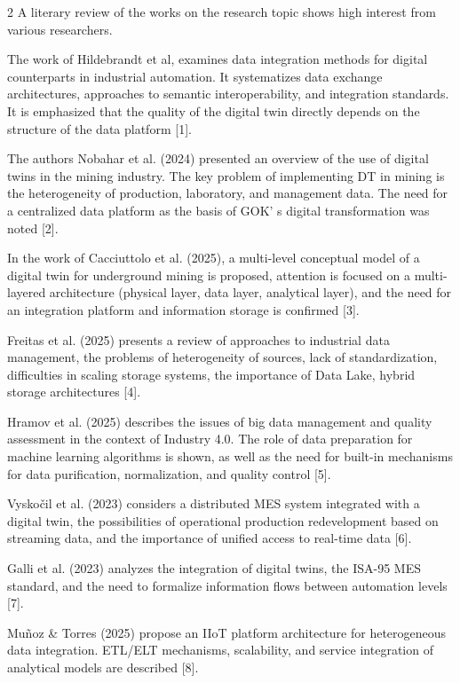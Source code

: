 \begin{multicols}{2}
A literary review of the works on the research topic shows high interest
from various researchers.

The work of Hildebrandt et al, examines data integration methods for
digital counterparts in industrial automation. It systematizes data
exchange architectures, approaches to semantic interoperability, and
integration standards. It is emphasized that the quality of the digital
twin directly depends on the structure of the data platform {[}1{]}.

The authors Nobahar et al. (2024) presented an overview of the use of
digital twins in the mining industry. The key problem of implementing DT
in mining is the heterogeneity of production, laboratory, and management
data. The need for a centralized data platform as the basis of
GOK' s digital transformation was noted {[}2{]}.

In the work of Cacciuttolo et al. (2025), a multi-level conceptual model
of a digital twin for underground mining is proposed, attention is
focused on a multi-layered architecture (physical layer, data layer,
analytical layer), and the need for an integration platform and
information storage is confirmed {[}3{]}.

Freitas et al. (2025) presents a review of approaches to industrial data
management, the problems of heterogeneity of sources, lack of
standardization, difficulties in scaling storage systems, the importance
of Data Lake, hybrid storage architectures {[}4{]}.

Hramov et al. (2025) describes the issues of big data management and
quality assessment in the context of Industry 4.0. The role of data
preparation for machine learning algorithms is shown, as well as the
need for built-in mechanisms for data purification, normalization, and
quality control {[}5{]}.

Vyskočil et al. (2023) considers a distributed MES system integrated
with a digital twin, the possibilities of operational production
redevelopment based on streaming data, and the importance of unified
access to real-time data {[}6{]}.

Galli et al. (2023) analyzes the integration of digital twins, the
ISA-95 MES standard, and the need to formalize information flows between
automation levels {[}7{]}.

Muñoz \& Torres (2025) propose an IIoT platform architecture for
heterogeneous data integration. ETL/ELT mechanisms, scalability, and
service integration of analytical models are described {[}8{]}.


\end{multicols}
